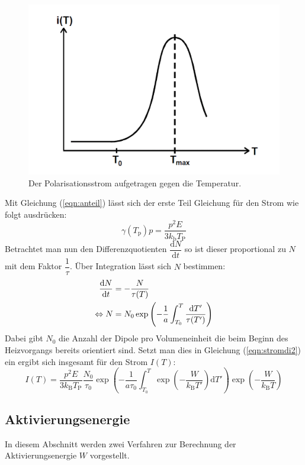 \begin{figure}[h!]
  \centering
  \includegraphics[scale=0.5]{fig/stromver.png}
  \caption{Der Polarisationsstrom aufgetragen gegen die Temperatur.}
  \label{fig:stromdi}
\end{figure}
Mit Gleichung (\ref{eqn:anteil}) lässt sich der erste Teil Gleichung für den Strom wie folgt ausdrücken:
\begin{equation}
  \label{eqn:stromdi2}
  \gamma(T_\mathrm{p})p=\dfrac{p^2E}{3 k_\mathrm{b} T_\mathrm{P}}
\end{equation}
Betrachtet man nun den Differenzquotienten $\dfrac{\mathrm{d} N}{\mathrm{d} t}$ so ist dieser proportional zu $N$ mit dem Faktor $\dfrac{1}{\tau}$. Über Integration lässt sich $N$ bestimmen:
\begin{align}
  \dfrac{\mathrm{d} N}{\mathrm{d} t}&=-\dfrac{N}{\tau(T)} \notag \\
  \label{eqn:einset}
  \Leftrightarrow N&=N_\mathrm{0}\exp\left(-\dfrac{1}{a}\int_{T_0}^T\dfrac{\mathrm{d} T'}{\tau(T')}\right)
\end{align}
Dabei gibt $N_\mathrm{0}$ die Anzahl der Dipole pro Volumeneinheit die beim Beginn des Heizvorgangs bereits orientiert sind. Setzt man dies in Gleichung (\ref{eqn:stromdi2}) ein ergibt sich insgesamt für den Strom $I(T)$:
\begin{equation}
  \label{eqn:stromdi3}
  I(T) = \dfrac{p^2 E}{3k_\mathrm{B}T_\mathrm{P}}\dfrac{N_\mathrm{0}}{\tau_\mathrm{0}} \exp{\left(-\dfrac{1}{a\tau_\mathrm{0}}\int_{T_0}^T\exp{\left(-\dfrac{W}{k_\mathrm{B}T'}\right)\mathrm{d}T'}\right)}\exp{\left(-\dfrac{W}{ k_\mathrm{B}T}\right)}
\end{equation}
\subsection{Aktivierungsenergie}
\label{sec:akti}
In diesem Abschnitt werden zwei Verfahren zur Berechnung der Aktivierungsenergie $W$ vorgestellt.
